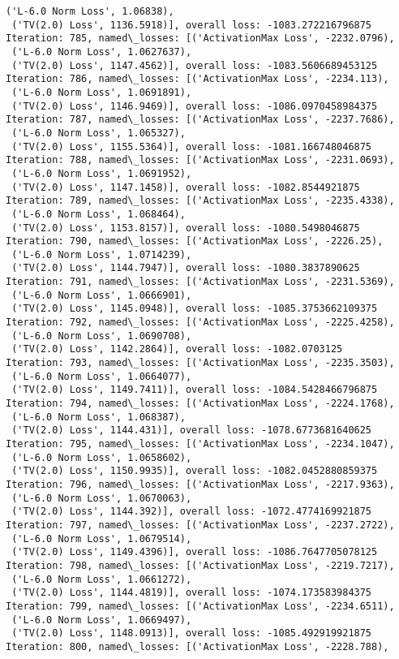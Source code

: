 \documentclass[10pt]{article}
\begin{document}
\begin{Verbatim}[commandchars=\\\{\}]
 ('L-6.0 Norm Loss', 1.06838),
 ('TV(2.0) Loss', 1136.5918)], overall loss: -1083.272216796875
Iteration: 785, named\_losses: [('ActivationMax Loss', -2232.0796),
 ('L-6.0 Norm Loss', 1.0627637),
 ('TV(2.0) Loss', 1147.4562)], overall loss: -1083.5606689453125
Iteration: 786, named\_losses: [('ActivationMax Loss', -2234.113),
 ('L-6.0 Norm Loss', 1.0691891),
 ('TV(2.0) Loss', 1146.9469)], overall loss: -1086.0970458984375
Iteration: 787, named\_losses: [('ActivationMax Loss', -2237.7686),
 ('L-6.0 Norm Loss', 1.065327),
 ('TV(2.0) Loss', 1155.5364)], overall loss: -1081.166748046875
Iteration: 788, named\_losses: [('ActivationMax Loss', -2231.0693),
 ('L-6.0 Norm Loss', 1.0691952),
 ('TV(2.0) Loss', 1147.1458)], overall loss: -1082.8544921875
Iteration: 789, named\_losses: [('ActivationMax Loss', -2235.4338),
 ('L-6.0 Norm Loss', 1.068464),
 ('TV(2.0) Loss', 1153.8157)], overall loss: -1080.5498046875
Iteration: 790, named\_losses: [('ActivationMax Loss', -2226.25),
 ('L-6.0 Norm Loss', 1.0714239),
 ('TV(2.0) Loss', 1144.7947)], overall loss: -1080.3837890625
Iteration: 791, named\_losses: [('ActivationMax Loss', -2231.5369),
 ('L-6.0 Norm Loss', 1.0666901),
 ('TV(2.0) Loss', 1145.0948)], overall loss: -1085.3753662109375
Iteration: 792, named\_losses: [('ActivationMax Loss', -2225.4258),
 ('L-6.0 Norm Loss', 1.0690708),
 ('TV(2.0) Loss', 1142.2864)], overall loss: -1082.0703125
Iteration: 793, named\_losses: [('ActivationMax Loss', -2235.3503),
 ('L-6.0 Norm Loss', 1.0664077),
 ('TV(2.0) Loss', 1149.7411)], overall loss: -1084.5428466796875
Iteration: 794, named\_losses: [('ActivationMax Loss', -2224.1768),
 ('L-6.0 Norm Loss', 1.068387),
 ('TV(2.0) Loss', 1144.431)], overall loss: -1078.6773681640625
Iteration: 795, named\_losses: [('ActivationMax Loss', -2234.1047),
 ('L-6.0 Norm Loss', 1.0658602),
 ('TV(2.0) Loss', 1150.9935)], overall loss: -1082.0452880859375
Iteration: 796, named\_losses: [('ActivationMax Loss', -2217.9363),
 ('L-6.0 Norm Loss', 1.0670063),
 ('TV(2.0) Loss', 1144.392)], overall loss: -1072.4774169921875
Iteration: 797, named\_losses: [('ActivationMax Loss', -2237.2722),
 ('L-6.0 Norm Loss', 1.0679514),
 ('TV(2.0) Loss', 1149.4396)], overall loss: -1086.7647705078125
Iteration: 798, named\_losses: [('ActivationMax Loss', -2219.7217),
 ('L-6.0 Norm Loss', 1.0661272),
 ('TV(2.0) Loss', 1144.4819)], overall loss: -1074.173583984375
Iteration: 799, named\_losses: [('ActivationMax Loss', -2234.6511),
 ('L-6.0 Norm Loss', 1.0669497),
 ('TV(2.0) Loss', 1148.0913)], overall loss: -1085.492919921875
Iteration: 800, named\_losses: [('ActivationMax Loss', -2228.788),

\end{Verbatim}
\end{document}
